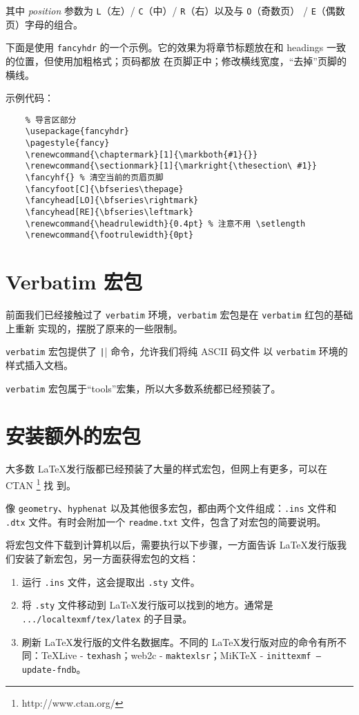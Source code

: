 \documentclass[UTF8]{ctexart}
\begin{document}
其中 \emph{position} 参数为 \texttt{L}（左）/ \texttt{C}（中）/ \texttt{R}（右）以及与 \texttt{O}（奇数页）
/ \texttt{E}（偶数页）字母的组合。

下面是使用 \texttt{fancyhdr} 的一个示例。它的效果为将章节标题放在和 headings 一致的位置，但使用加粗格式；页码都放
在页脚正中；修改横线宽度，“去掉”页脚的横线。

示例代码：
\begin{verbatim}
    % 导言区部分
    \usepackage{fancyhdr}
    \pagestyle{fancy}
    \renewcommand{\chaptermark}[1]{\markboth{#1}{}}
    \renewcommand{\sectionmark}[1]{\markright{\thesection\ #1}}
    \fancyhf{} % 清空当前的页眉页脚
    \fancyfoot[C]{\bfseries\thepage}
    \fancyhead[LO]{\bfseries\rightmark}
    \fancyhead[RE]{\bfseries\leftmark}
    \renewcommand{\headrulewidth}{0.4pt} % 注意不用 \setlength
    \renewcommand{\footrulewidth}{0pt}
\end{verbatim}

\section{Verbatim 宏包}
前面我们已经接触过了 \texttt{verbatim} 环境，\texttt{verbatim} 宏包是在 \texttt{verbatim} 红包的基础上重新
实现的，摆脱了原来的一些限制。

\texttt{verbatim} 宏包提供了 \texttt|| 命令，允许我们将纯 ASCII 码文件
以 \texttt{verbatim} 环境的样式插入文档。

\texttt{verbatim} 宏包属于“tools”宏集，所以大多数系统都已经预装了。

\section{安装额外的宏包}
大多数 \LaTeX 发行版都已经预装了大量的样式宏包，但网上有更多，可以在 CTAN \footnote{http://www.ctan.org/} 找
到。

像 \texttt{geometry}、\texttt{hyphenat} 以及其他很多宏包，都由两个文件组成：\texttt{.ins} 文件和
\texttt{.dtx} 文件。有时会附加一个 \texttt{readme.txt} 文件，包含了对宏包的简要说明。

将宏包文件下载到计算机以后，需要执行以下步骤，一方面告诉 \LaTeX 发行版我们安装了新宏包，另一方面获得宏包的文档：
\begin{enumerate}
    \item 运行 \texttt{.ins} 文件，这会提取出 \texttt{.sty} 文件。
    \item 将 \texttt{.sty} 文件移动到 \LaTeX 发行版可以找到的地方。通常是 \texttt{.../localtexmf/tex/latex}
    的子目录。
    \item 刷新 \LaTeX 发行版的文件名数据库。不同的 \LaTeX 发行版对应的命令有所不同：\TeX Live -
    \texttt{texhash}；web2c - \texttt{maktexlsr}；MiK\TeX{} -
    \texttt{inittexmf --update-fndb}。
\end{enumerate}
\end{document}
